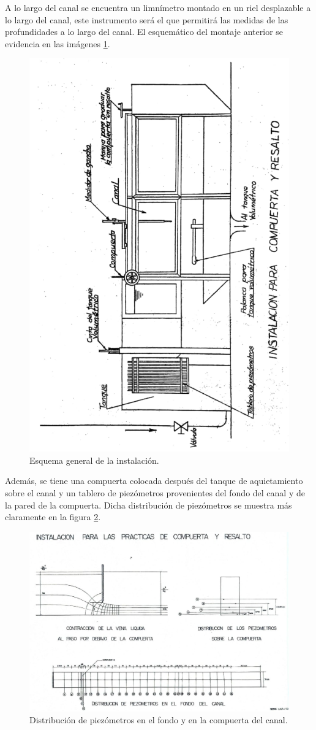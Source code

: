 \documentclass[10pt, a4paper]{exam}
\begin{document}
\newpage

A lo largo del canal se encuentra un limnímetro montado en un riel desplazable a lo largo del canal, este instrumento será el que permitirá las medidas de las profundidades a lo largo del canal. El esquemático del montaje anterior se evidencia en las imágenes \ref{fig:esqpdf}.

\begin{figure}[h]
    \centering
    \includegraphics[angle=270,width=0.6\linewidth]{Images/esquema.png}
    \caption{Esquema general de la instalación.}
    \label{fig:esqpdf}
\end{figure}

Además, se tiene una compuerta colocada después del tanque de aquietamiento sobre el canal y un tablero de piezómetros provenientes del fondo del canal y de la pared de la compuerta. Dicha distribución de piezómetros se muestra más claramente en la figura \ref{fig:piezo}.

\begin{figure}[h]
    \centering
    \includegraphics[width=0.76\linewidth]{Images/piezo.jpg}
    \caption{Distribución de piezómetros en el fondo y en la compuerta del canal.}
    \label{fig:piezo}
\end{figure}
\end{document}
